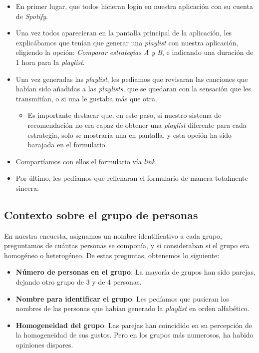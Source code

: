 \begin{itemize}
    \item En primer lugar, que todos hicieran login en nuestra aplicación con su cuenta de \textit{Spotify}.
    \item Una vez todos aparecieran en la pantalla principal de la aplicación, les explicábamos que tenían que generar una \textit{playlist} con nuestra aplicación, eligiendo
    la opción: \textit{Comparar estrategias A y B}, e indicando una duración de 1 hora para la \textit{playlist}.
    \item Una vez generadas las \textit{playlist}, les pedíamos que revisaran las canciones que habían sido añadidas a las \textit{playlists}, que se quedaran con la 
    sensación que les transmitían, o si una le gustaba más que otra.
    \begin{itemize}
        \item Es importante destacar que, en este paso, si nuestro sistema de recomendación no era capaz de obtener una \textit{playlist}
        diferente para cada estrategia, solo se mostraría una en pantalla, y esta opción ha sido barajada en el formulario.
    \end{itemize}
    \item Compartíamos con ellos el formulario vía \textit{link}.
    \item Por último, les pedíamos que rellenaran el formulario de manera totalmente sincera.
\end{itemize}


\subsection{Contexto sobre el grupo de personas\label{SEC:CONTEXTOS}}

En nuestra encuesta, asignamos un nombre identificativo a cada grupo, preguntamos de cuántas personas se componía, 
y si consideraban si el grupo era homogéneo o heterogéneo. De estas preguntas, obtenemos lo siguiente:

\begin{itemize}
    \item \textbf{Número de personas en el grupo}: La mayoría de grupos han sido parejas, dejando otro grupo de 3 y de 4 personas.
    \item \textbf{Nombre para identificar el grupo}: Les pedíamos que pusieran los nombres de las personas que habían generado la \textit{playlist} en orden alfabético.
    \item \textbf{Homogeneidad del grupo}: Las parejas han coincidido en su percepción de la homogeneidad de sus gustos. Pero en los grupos
    más numerosos, ha habido opiniones dispares.
\end{itemize}

